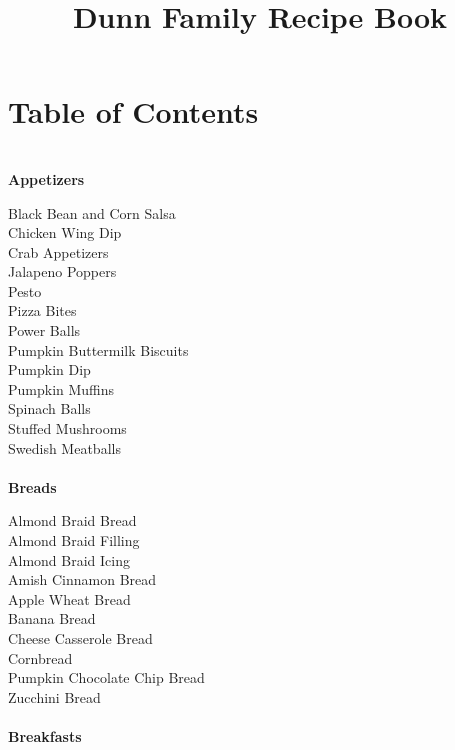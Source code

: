 \documentclass[11pt, twoside, openany]{book}
\title{ \LARGE \textbf{Dunn Family Recipe Book}}
\begin{document}
\maketitle
\section*{Table of Contents}
{~\vspace{2mm}\\ \Large \textbf{Appetizers}}\hfill\textbf{\pageref{appetizers}}

Black Bean and Corn Salsa\hrulefill\pageref{black-bean-and-corn-salsa}\\
Chicken Wing Dip\hrulefill\pageref{chicken-wing-dip}\\
Crab Appetizers\hrulefill\pageref{crab-appetizers}\\
Jalapeno Poppers\hrulefill\pageref{jalapeno-poppers}\\
Pesto\hrulefill\pageref{pesto}\\
Pizza Bites\hrulefill\pageref{pizza-bites}\\
Power Balls\hrulefill\pageref{power-balls}\\
Pumpkin Buttermilk Biscuits\hrulefill\pageref{pumpkin-buttermilk-biscuits}\\
Pumpkin Dip\hrulefill\pageref{pumpkin-dip}\\
Pumpkin Muffins\hrulefill\pageref{pumpkin-muffins}\\
Spinach Balls\hrulefill\pageref{spinach-balls}\\
Stuffed Mushrooms\hrulefill\pageref{stuffed-mushrooms}\\
Swedish Meatballs\hrulefill\pageref{swedish-meatballs}\\
{~\vspace{2mm}\\ \Large \textbf{Breads}}\hfill\textbf{\pageref{breads}}

Almond Braid Bread\hrulefill\pageref{almond-braid-bread}\\
Almond Braid Filling\hrulefill\pageref{almond-braid-filling}\\
Almond Braid Icing\hrulefill\pageref{almond-braid-icing}\\
Amish Cinnamon Bread\hrulefill\pageref{amish-cinnamon-bread}\\
Apple Wheat Bread\hrulefill\pageref{apple-wheat-bread}\\
Banana Bread\hrulefill\pageref{banana-bread}\\
Cheese Casserole Bread\hrulefill\pageref{cheese-casserole-bread}\\
Cornbread\hrulefill\pageref{cornbread}\\
Pumpkin Chocolate Chip Bread\hrulefill\pageref{pumpkin-chocolate-chip-bread}\\
Zucchini Bread\hrulefill\pageref{zucchini-bread}\\
{~\vspace{2mm}\\ \Large \textbf{Breakfasts}}\hfill\textbf{\pageref{breakfasts}}
\end{document}

